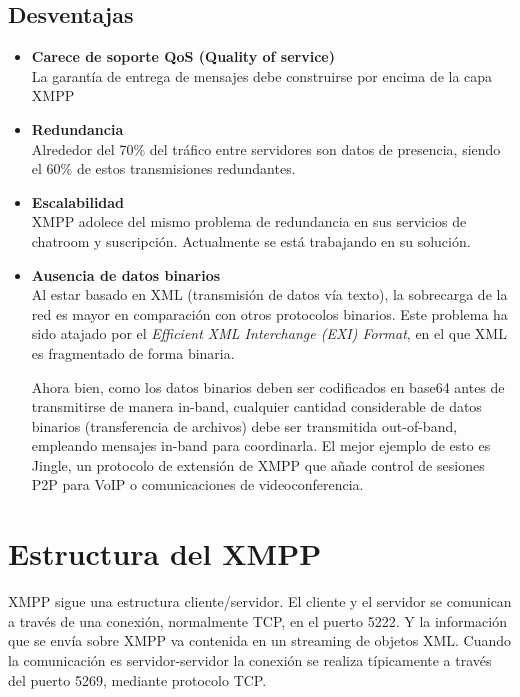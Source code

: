 \documentclass[a4paper, 11pt]{article} %
\begin{document}
   \subsection{Desventajas}
   \begin{itemize}
    \item \textbf{Carece de soporte QoS (Quality of service)}\\
    La garantía de entrega de mensajes debe construirse por encima de la capa XMPP
    \item \textbf{Redundancia}\\
    Alrededor del 70\% del tráfico entre servidores son datos de presencia, siendo el 60\% de estos transmisiones 
    redundantes.
    \item \textbf{Escalabilidad}\\
    XMPP adolece del mismo problema de redundancia en sus servicios de chatroom y suscripción. Actualmente se está
    trabajando en su solución.
    \item \textbf{Ausencia de datos binarios}\\
    Al estar basado en XML (transmisión de datos vía texto), la sobrecarga de la red es mayor en comparación 
    con otros protocolos binarios. Este problema ha sido atajado por el \textit{Efficient XML Interchange (EXI) Format},
    en el que XML es fragmentado de forma binaria.
    
    Ahora bien, como los datos binarios deben ser codificados en base64 antes de transmitirse de manera in-band,
    cualquier cantidad considerable de datos binarios (transferencia de archivos) debe ser transmitida out-of-band,
    empleando mensajes in-band para coordinarla. El mejor ejemplo de esto es Jingle, un protocolo de extensión de XMPP
    que añade control de sesiones P2P para VoIP o comunicaciones de videoconferencia.
    
   \end{itemize}


\section{Estructura del XMPP}
  XMPP sigue una estructura cliente/servidor. El cliente y el servidor se comunican a través 
  de una conexión, normalmente TCP, en el puerto 5222. Y la información que se envía sobre XMPP va contenida
  en un streaming de objetos XML. Cuando la comunicación es servidor-servidor la conexión se realiza típicamente 
  a través del puerto 5269, mediante protocolo TCP.
 
\end{document}

